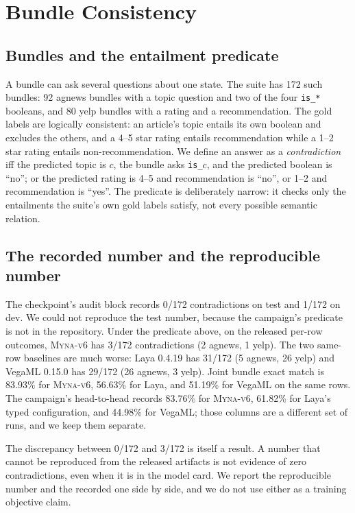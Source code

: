 \documentclass[11pt]{article}
\newcommand{\vsix}{\textsc{Myna-v6}}
\begin{document}


\section{Bundle Consistency}
\label{sec:consistency}

\subsection{Bundles and the entailment predicate}
A bundle can ask several questions about one state. The suite has 172 such bundles: 92 agnews bundles with a topic question and two of the four \texttt{is\_*} booleans, and 80 yelp bundles with a rating and a recommendation. The gold labels are logically consistent: an article's topic entails its own boolean and excludes the others, and a 4--5 star rating entails recommendation while a 1--2 star rating entails non-recommendation. We define an answer as a \emph{contradiction} iff the predicted topic is $c$, the bundle asks \texttt{is\_$c$}, and the predicted boolean is “no”; or the predicted rating is 4--5 and recommendation is “no”, or 1--2 and recommendation is “yes”. The predicate is deliberately narrow: it checks only the entailments the suite's own gold labels satisfy, not every possible semantic relation.

\subsection{The recorded number and the reproducible number}
The checkpoint's audit block records 0/172 contradictions on test and 1/172 on dev. We could not reproduce the test number, because the campaign's predicate is not in the repository. Under the predicate above, on the released per-row outcomes, \vsix{} has 3/172 contradictions (2 agnews, 1 yelp). The two same-row baselines are much worse: Laya 0.4.19 has 31/172 (5 agnews, 26 yelp) and VegaML 0.15.0 has 29/172 (26 agnews, 3 yelp). Joint bundle exact match is 83.93\% for \vsix{}, 56.63\% for Laya, and 51.19\% for VegaML on the same rows. The campaign's head-to-head records 83.76\% for \vsix{}, 61.82\% for Laya's typed configuration, and 44.98\% for VegaML; those columns are a different set of runs, and we keep them separate.

The discrepancy between 0/172 and 3/172 is itself a result. A number that cannot be reproduced from the released artifacts is not evidence of zero contradictions, even when it is in the model card. We report the reproducible number and the recorded one side by side, and we do not use either as a training objective claim.
\end{document}
